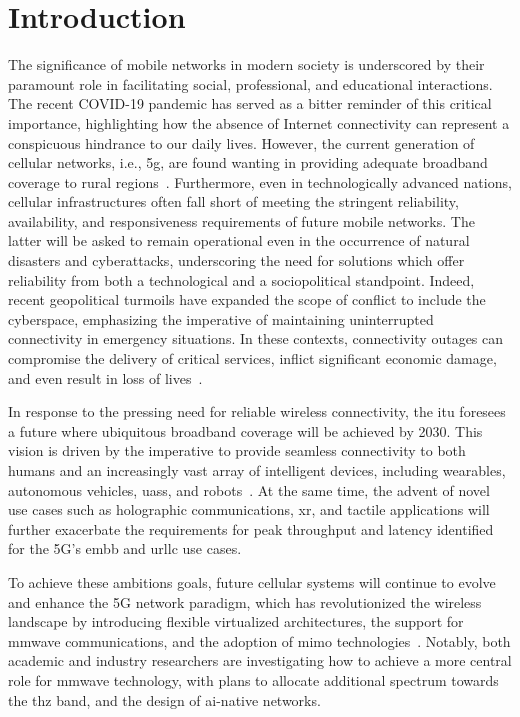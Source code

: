 \glsresetall
\chapter{Introduction}
\label{ch:intro}

The significance of mobile networks in modern society is underscored by their paramount role in facilitating social, professional, and educational interactions. The recent COVID-19 pandemic has served as a bitter reminder of this critical importance, highlighting how the absence of Internet connectivity can represent a conspicuous hindrance to our daily lives.
However, the current generation of cellular networks, i.e., \gls{5g}, are found wanting in providing adequate broadband coverage to rural regions~\cite{yaacoub2020key}. Furthermore, even in technologically advanced nations, cellular infrastructures often fall short of meeting the stringent reliability, availability, and responsiveness requirements of future mobile networks. The latter will be asked to remain operational even in the occurrence of natural disasters and cyberattacks, underscoring the need for solutions which offer reliability from both a technological and a sociopolitical standpoint.
Indeed, recent geopolitical turmoils have expanded the scope of conflict to include the cyberspace, emphasizing the imperative of maintaining uninterrupted connectivity in emergency situations. In these contexts, connectivity outages can compromise the delivery of critical services, inflict significant economic damage, and even result in loss of lives~\cite{internet_ukr_afg}.

In response to the pressing need for reliable wireless connectivity, the \gls{itu} foresees a future where ubiquitous broadband coverage will be achieved by 2030. This vision is driven by the imperative to provide seamless connectivity to both humans and an increasingly vast array of intelligent devices, including wearables, autonomous vehicles, \glspl{uas}, and robots~\cite{mozaffari2018beyond}.
At the same time, the advent of novel use cases such as holographic communications, \gls{xr}, and tactile applications will further exacerbate the requirements for peak throughput and latency identified for the 5G's \gls{embb} and \gls{urllc} use cases. 

To achieve these ambitions goals, future cellular systems will continue to evolve and enhance the 5G network paradigm, which has revolutionized the wireless landscape by introducing flexible virtualized architectures, the support for \gls{mmwave} communications, and the adoption of \gls{mimo} technologies~\cite{ghosh20195g}. 
Notably, both academic and industry researchers are investigating how to achieve a more central role for \gls{mmwave} technology, with plans to allocate additional spectrum towards the \gls{thz} band, and the design of \gls{ai}-native networks.

